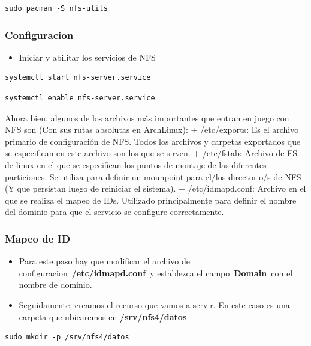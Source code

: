 \documentclass[12pt]{extarticle}
\providecommand{\tightlist}{%
      \setlength{\itemsep}{0pt}\setlength{\parskip}{0pt}}
\begin{document}
\begin{verbatim}
sudo pacman -S nfs-utils
\end{verbatim}

\subsubsection{Configuracion}\label{configuracion}

\begin{itemize}
\tightlist
\item
  Iniciar y abilitar los servicios de NFS
\end{itemize}

\begin{verbatim}
systemctl start nfs-server.service
\end{verbatim}

\begin{verbatim}
systemctl enable nfs-server.service
\end{verbatim}

Ahora bien, algunos de los archivos más importantes que entran en juego
con NFS son (Con sus rutas absolutas en ArchLinux): + /etc/exports: Es
el archivo primario de configuración de NFS. Todos los archivos y
carpetas exportados que se especifican en este archivo son los que se
sirven. + /etc/fstab: Archivo de FS de linux en el que se especifican
los puntos de montaje de las diferentes particiones. Se utiliza para
definir un mounpoint para el/los directorio/s de NFS (Y que persistan
luego de reiniciar el sistema). + /etc/idmapd.conf: Archivo en el que se
realiza el mapeo de IDs. Utilizado principalmente para definir el nombre
del dominio para que el servicio se configure correctamente.

\subsubsection{Mapeo de ID}\label{mapeo-de-id}

\begin{itemize}
\item
  Para este paso hay que modificar el archivo de
  configuracion~\textbf{/etc/idmapd.conf}~y establezca el
  campo~\textbf{Domain}~con el nombre de dominio.
\item
  Seguidamente, creamos el recurso que vamos a servir. En este caso es
  una carpeta que ubicaremos en \textbf{/srv/nfs4/datos}
\end{itemize}

\begin{verbatim}
sudo mkdir -p /srv/nfs4/datos
\end{verbatim}
\end{document}
